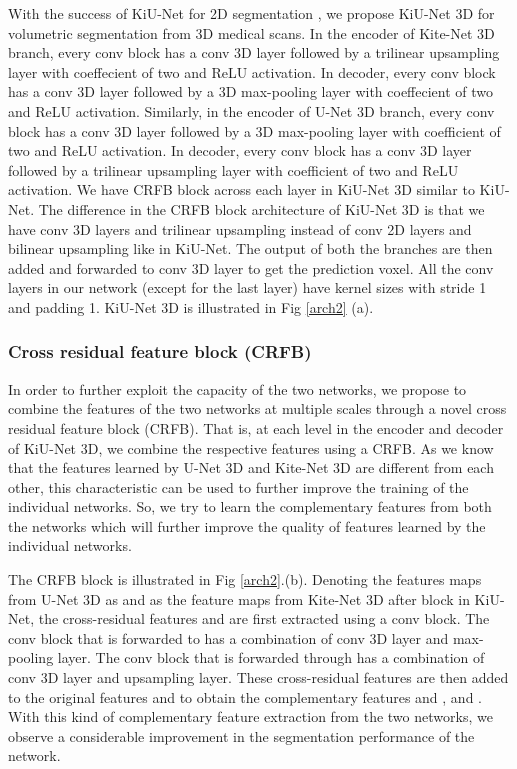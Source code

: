 \documentclass[journal,twoside,web]{ieeecolor}
\begin{document}
With the success of KiU-Net for 2D segmentation \cite{valanarasu2020kiu}, we propose KiU-Net 3D for  volumetric segmentation from 3D medical scans. In the encoder of Kite-Net 3D branch, every conv block has a conv 3D layer followed by a trilinear upsampling layer with coeffecient of two and ReLU activation. In decoder, every conv block has a conv 3D layer followed by a 3D max-pooling layer with coeffecient of two and ReLU activation. Similarly, in  the encoder of U-Net 3D branch, every conv block has a conv 3D layer followed by a 3D max-pooling layer with coefficient of two and ReLU activation. In decoder, every conv block has a conv 3D layer followed by a trilinear upsampling layer with coefficient of two and ReLU activation. We have CRFB block across each layer in KiU-Net 3D similar to KiU-Net. The difference in the CRFB block architecture of KiU-Net 3D is that we have conv 3D layers and trilinear upsampling instead of conv 2D layers and bilinear upsampling like in KiU-Net. The output of both the branches are then added and forwarded to  conv 3D layer to get the prediction voxel. All the conv layers in our network (except for the last layer) have  kernel sizes with stride 1 and padding 1. KiU-Net 3D is illustrated in Fig \ref{arch2} (a).   



\subsubsection{Cross residual feature block (CRFB)}

In order to further exploit the capacity of the two networks, we propose to combine the features of the two networks at multiple scales through a novel cross residual feature block (CRFB). That is, at each level in the encoder and decoder of KiU-Net 3D, we combine the respective features using a CRFB.  As we know that the features learned by U-Net 3D and Kite-Net 3D are different from each other, this characteristic can be used to further improve the training of the individual networks. So, we try to learn the complementary features from both the networks which will further improve the quality of features learned by the individual networks.

The CRFB block is illustrated in Fig \ref{arch2}.(b). Denoting  the features maps from U-Net 3D as  and   as the feature maps from Kite-Net 3D after  block in KiU-Net,  the cross-residual features  and  are first extracted using a conv block. The conv block that  is forwarded to has a combination of conv 3D layer and max-pooling layer. The conv block that  is forwarded through has a combination of conv 3D layer and upsampling layer.  These cross-residual features are then added to the original features  and     to obtain the complementary features  and  ,   and . With this kind of complementary feature extraction from the two networks, we observe a considerable improvement in the segmentation performance of the network.   
\end{document}
